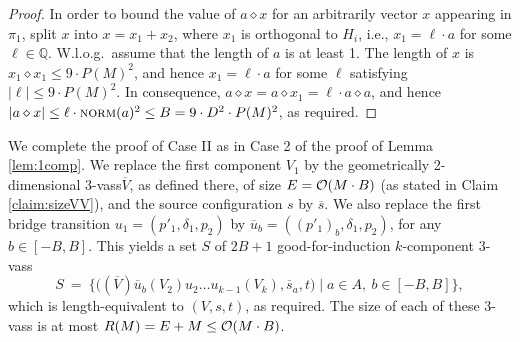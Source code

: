 \documentclass[a4paper, UKenglish, cleveref, autoref, thm-restate]{lipics-v2021}
\newcommand{\Q}{\mathbb{Q}}
\newcommand{\set}[1]{\{#1\}}
\newcommand{\setof}[2]{\set{#1 \mid #2}}
\newcommand{\norm}{\textsc{norm}}
\newcommand{\OO}{{\cal O}}
\newcommand{\vass}{{\sc vass}\xspace}
\newcommand{\tvass}{\parvass 3}
\newcommand{\geomvass}{geometrically 2-dimensional \tvass}
\newcommand{\parvass}[1]{{$#1$-\vass}\xspace}
\newcommand{\ktvassmodmod}{(\essdvass V) \essdvass u_{b} (V_2) u_2 \ldots u_{k-1} (V_k)}
\newcommand{\setfromto}[2]{[#1, #2]}
\newcommand{\Wlog}{W.l.o.g.~}
\newcommand{\essdvass}[1]{\overline{#1}}
\newcommand{\innprod}[2]{#1 \diamond #2} \newcommand{\pair}[2]{#1_{#2}}
\newcommand{\absv}[1]{|#1|}
\begin{document}
\begin{appendixproof}
\begin{proof}
In order to bound the value of $\innprod {a} x$ for an arbitrarily vector $x$ appearing in $\pi_1$,
split $x$ into $x = x_1 + x_2$, where $x_1$ is orthogonal to $H_i$, i.e., $x_1 = \ell \cdot a$ for some $\ell\in\Q$.
\Wlog assume that the length of $a$ is at least 1.
The length of $x$  is $\innprod {x_1}{x_1}\leq 9\cdot P(M)^2$, and hence
$x_1 = \ell \cdot a$ for some $\ell$ satisfying $\absv \ell \leq 9\cdot P(M)^2$.
In consequence,  $\innprod {a} x = \innprod {a} {x_1} = \ell \cdot \innprod {a} {a}$,
and hence $\absv {\innprod {a} x} \leq \ell \cdot \norm(a)^2 \leq B= 9\cdot D^2 \cdot P(M)^2$, as required.
\end{proof}
We complete the proof of Case II as in Case 2 of the proof of Lemma \ref{lem:1comp}.
We replace the first component $V_1$ by the \geomvass $\essdvass V$, as defined there,
of size $E = \OO(M\cdot B)$ (as stated in Claim \ref{claim:sizeVV}),
and the source configuration $s$ by $\essdvass s$.
We also replace the first bridge transition $u_1 = (p'_1, \delta_1, p_2)$ by
$\essdvass u_{b} = (\pair{(p'_1)} b, \delta_1, p_2)$, for any $b\in\setfromto{-B} B$.
This yields a set $S$ of $2B+1$ good-for-induction $k$-component \tvass
\[
S \ = \ \setof{\big(\ktvassmodmod, \essdvass s_a, t \big)}{a\in A, \ b\in \setfromto {-B} B},
\]
which is length-equivalent to $(V, s, t)$, as required. 
The size of each of these \tvass is at most $R(M) = E+M \leq \OO(M \cdot B)$.
\end{appendixproof}
\end{document}
